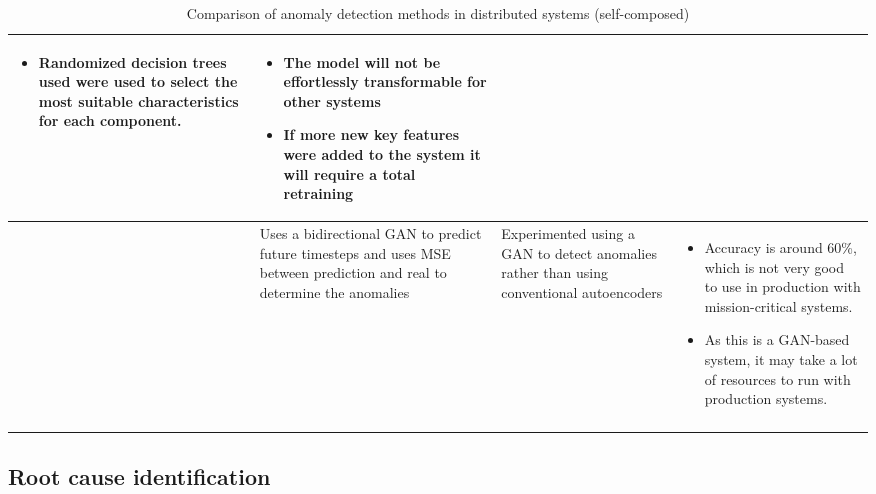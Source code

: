 \begin{longtable}{| p{20mm} | p{43mm} | p{43mm} | p{43mm} |}
\begin{itemize}[leftmargin=*,noitemsep,nolistsep]
    \item Randomized decision trees used were used to select the most suitable characteristics for each component.
  \vspace{-7mm}
  \end{itemize} &
  \vspace{-8mm}
  \begin{itemize}[leftmargin=*,noitemsep,nolistsep] 
    \item The model will not be effortlessly transformable for other systems
    \item If more new key features were added to the system it will require a total retraining
  \vspace{-7mm}
  \end{itemize} \\ \hline
  \cite{kumarage2019generative} &
  Uses a bidirectional GAN to predict future timesteps and uses MSE between prediction and real to determine the anomalies &
  Experimented using a GAN to detect anomalies rather than using conventional autoencoders &
  \vspace{-8mm}
  \begin{itemize}[leftmargin=*,noitemsep,nolistsep] 
    \item Accuracy is around 60\%, which is not very good to use in production with mission-critical systems.
    \item As this is a GAN-based system, it may take a lot of resources to run with production systems.
  \vspace{-7mm}
  \end{itemize} \\ \hline
  \caption{Comparison of anomaly detection methods in distributed systems (self-composed)}
\end{longtable}

\subsection{Root cause identification}

